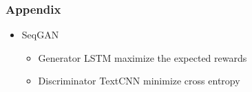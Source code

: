 \documentclass{beamer}
\begin{document}
\begin{frame}
\frametitle{Appendix}
\begin{itemize}
\item SeqGAN 
\begin{itemize}
		\item Generator LSTM maximize the expected rewards
		\item Discriminator TextCNN minimize cross entropy
\end{itemize}
\end{itemize}
\end{frame}
\end{document}
